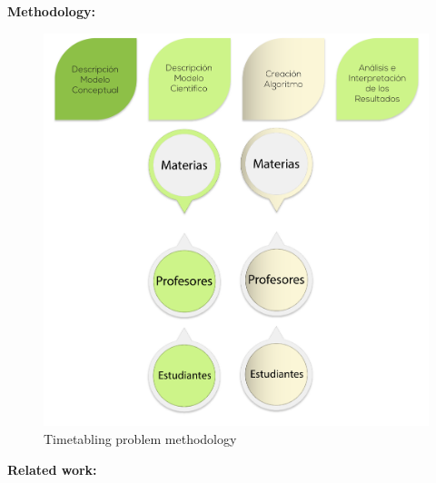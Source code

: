 \documentclass[centering]{report}
\newenvironment{slide}
    {\newpage
    \vspace*{\fill}
    }
    { 
     \vspace*{\fill}
    }
\begin{document}
\begin{slide}
\textbf{Methodology:}\\

\begin{figure}[h!]
  \centering
  \includegraphics[width=0.6\linewidth]{methodologyflow2.png}
  \caption{\label{fig:methodologyflow2}Timetabling problem methodology}
\end{figure}
\end{slide}

\begin{slide}
\textbf{Related work:}\\

\end{slide}
\end{document}
